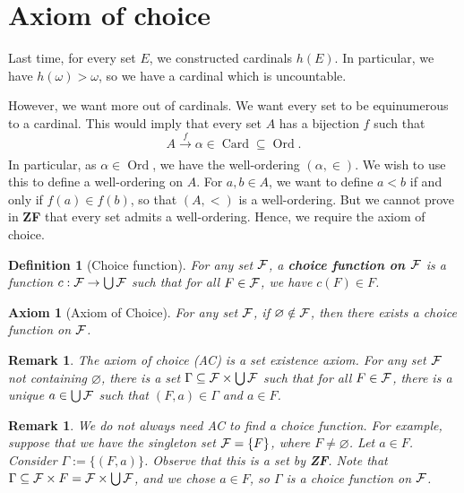 \documentclass[10pt]{article}
\DeclareMathOperator{\Ord}{Ord}
\DeclareMathOperator{\Card}{Card}
\theoremstyle{newstyle}
\newtheorem{remark}[thm]{Remark}
\newtheorem{defn}[thm]{Definition}
\newtheorem{axiom}[thm]{Axiom}
\begin{document}
 
\newpage\section{Axiom of choice} 

Last time, for every set $E$, we constructed cardinals $h(E)$. In particular, we have 
$h(\omega) > \omega$, so we have a cardinal which is uncountable. 

However, we want more out of cardinals. We want every set to be equinumerous to a cardinal. 
This would imply that every set $A$ has a bijection $f$ such that 
\[ A \xrightarrow[]{f} \alpha \in \Card \subseteq \Ord. \] 
In particular, as $\alpha \in \Ord$, we have the well-ordering $(\alpha, \in)$. 
We wish to use this to define a well-ordering on $A$. For $a, b \in A$, we want 
to define $a < b$ if and only if $f(a) \in f(b)$, so that $(A, <)$ is a well-ordering. 
But we cannot prove in {\bf ZF} that every set admits a well-ordering. Hence, we require the 
axiom of choice. 

\begin{defn}[Choice function] 
For any set ${\cal F}$, a {\bf choice function on ${\cal F}$} is a function $c : 
{\cal F} \to \bigcup {\cal F}$ such that for all $F \in {\cal F}$, we have $c(F) \in F$. 
\end{defn}

\begin{axiom}[Axiom of Choice] 
For any set ${\cal F}$, if $\varnothing \notin {\cal F}$, then there exists a choice function 
on ${\cal F}$. 
\end{axiom}

\begin{remark} 
The axiom of choice (AC) is a set existence axiom. For any set ${\cal F}$ not containing 
$\varnothing$, there is a set $\Gamma \subseteq {\cal F} \times \bigcup {\cal F}$ such that 
for all $F \in {\cal F}$, there is a unique $a \in \bigcup {\cal F}$ such that 
$(F, a) \in \Gamma$ and $a \in F$. 
\end{remark}

\begin{remark} 
We do not always need AC to find a choice function. For example, suppose that we have the 
singleton set ${\cal F} = \{F\}$, where $F \neq \varnothing$. Let $a \in F$. 
Consider $\Gamma := \{(F, a)\}$. Observe that this is a set by {\bf ZF}. 
Note that $\Gamma \subseteq {\cal F} \times F = {\cal F} \times \bigcup {\cal F}$, 
and we chose $a \in F$, so $\Gamma$ is a choice function on ${\cal F}$. 
\end{remark}
\end{document}
